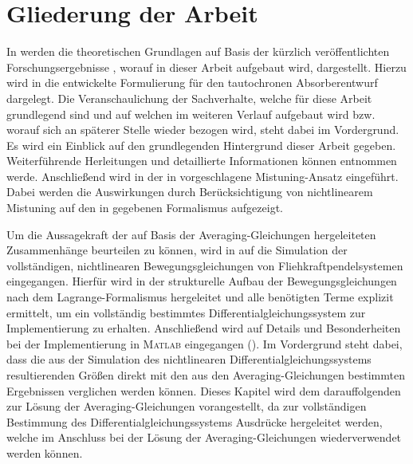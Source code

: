 \section{Gliederung der Arbeit}


In  werden die theoretischen Grundlagen auf Basis der kürzlich
veröffentlichten Forschungsergebnisse \cite{Mayet:Tautochronic}, 
worauf in  dieser Arbeit aufgebaut wird, dargestellt.
Hierzu wird in  die entwickelte Formulierung
für den tautochronen Absorberentwurf dargelegt. 
Die Veranschaulichung der Sachverhalte, welche für diese Arbeit
grundlegend sind und auf welchen im weiteren Verlauf aufgebaut wird bzw.
worauf sich an späterer Stelle wieder bezogen wird, steht dabei im Vordergrund.
Es wird ein Einblick auf den grundlegenden Hintergrund dieser Arbeit gegeben.
Weiterführende Herleitungen und detaillierte Informationen können \cite{Mayet:Tautochronic} entnommen werde.
Anschließend wird in  der in \cite{Mayet:CPVAMitMistuning} vorgeschlagene
Mistuning-Ansatz eingeführt. Dabei werden die Auswirkungen durch Berücksichtigung von nichtlinearem
Mistuning auf den in \cite{Mayet:Tautochronic} gegebenen Formalismus aufgezeigt.


Um die Aussagekraft der auf Basis der Averaging-Gleichungen hergeleiteten Zusammenhänge
beurteilen zu können, wird  in 
auf die Simulation der  vollständigen, nichtlinearen Bewegungsgleichungen 
von Fliehkraftpendelsystemen eingegangen.
Hierfür wird in  der strukturelle Aufbau der Bewegungsgleichungen 
nach dem Lagrange-Formalismus hergeleitet und
alle benötigten Terme explizit ermittelt, um ein vollständig bestimmtes Differentialgleichungssystem 
zur Implementierung zu erhalten.
Anschließend  wird auf Details und Besonderheiten bei der Implementierung 
in \textsc{Matlab} eingegangen ().
Im Vordergrund steht dabei, dass die aus der Simulation des nichtlinearen Differentialgleichungssystems 
resultierenden Größen direkt mit den aus den Averaging-Gleichungen 
bestimmten Ergebnissen verglichen werden können. 
Dieses Kapitel wird dem darauffolgenden  zur Lösung der Averaging-Gleichungen vorangestellt,
da zur vollständigen Bestimmung des Differentialgleichungssystems Ausdrücke hergeleitet werden,
welche im Anschluss bei der Lösung der Averaging-Gleichungen wiederverwendet werden können.



